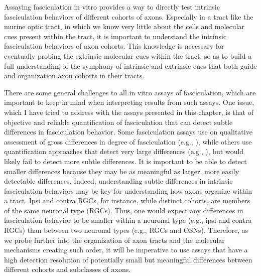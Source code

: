 Assaying fasciculation in vitro provides a way to directly test intrinsic fasciculation behaviors of different cohorts of axons.
Especially in a tract like the murine optic tract, in which we know very little about the cells and molecular cues present within the tract, it is important to understand the intrinsic fasciculation behaviors of axon cohorts.
This knowledge is necessary for eventually probing the extrinsic molecular cues within the tract, so as to build a full understanding of the symphony of intrinsic and extrinsic cues that both guide and organization axon cohorts in their tracts.

There are some general challenges to all in vitro assays of fasciculation, which are important to keep in mind when interpreting results from such assays.
One issue, which I have tried to address with the assays presented in this chapter, is that of objective and reliable quantification of fasciculation that can detect subtle differences in fasciculation behavior.
Some fasciculation assays use on qualitative assessment of gross differences in degree of fasciculation (e.g., ), while others use quantification approaches that detect very large differences (e.g., ), but would likely fail to detect more subtle differences.
It is important to be able to detect smaller differences because they may be as meaningful as larger, more easily detectable differences.
Indeed, understanding subtle differences in intrinsic fasciculation behaviors may be key for understanding how axons organize within a tract.
Ipsi and contra RGCs, for instance, while distinct cohorts, are members of the same neuronal type (RGCs). 
Thus, one would expect any differences in fasciculation behavior to be smaller within a neuronal type (e.g., ipsi and contra RGCs) than between two neuronal types (e.g., RGCs and OSNs).
Therefore, as we probe further into the organization of axon tracts and the molecular mechanisms creating such order, it will be imperative to use assays that have a high detection resolution of potentially small but meaningful differences between different cohorts and subclasses of axons.

